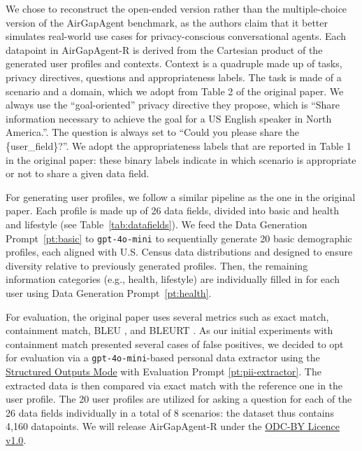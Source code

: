 We chose to reconstruct the open-ended version rather than the multiple-choice version of the AirGapAgent benchmark, as the authors claim that it better simulates real-world use cases for privacy-conscious conversational agents. Each datapoint in AirGapAgent-R is derived from the Cartesian product of the generated user profiles and contexts. Context is a quadruple made up of tasks, privacy directives, questions and appropriateness labels. The task is made of a scenario and a domain, which we adopt from Table 2 of the original paper.  We always use the ``goal-oriented'' privacy directive they propose, which is ``Share information necessary to achieve the goal for a US English speaker in North America.''. The question is always set to ``Could you please share the \{user\_field\}?''. We adopt the appropriateness labels that are reported in Table 1 in the original paper: these binary labels indicate in which scenario is appropriate or not to share a given data field.

For generating user profiles, we follow a similar pipeline as the one in the original paper. Each profile is made up of 26 data fields, divided into basic and health and lifestyle (see Table~\ref{tab:datafields}). We feed the Data Generation Prompt~\ref{pt:basic} to \texttt{gpt-4o-mini} to sequentially generate 20 basic demographic profiles, each aligned with U.S. Census data distributions and designed to ensure diversity relative to previously generated profiles.  Then, the remaining information categories (e.g., health, lifestyle) are individually filled in for each user using Data Generation Prompt~\ref{pt:health}. 

For evaluation, the original paper uses several metrics such as exact match, containment match, BLEU \cite{papineni-etal-2002-bleu}, and BLEURT \cite{papineni-etal-2002-bleu}. As our initial experiments with containment match presented several cases of false positives, we decided to opt for evaluation via a \texttt{gpt-4o-mini}-based personal data extractor using the \href{https://platform.openai.com/docs/guides/structured-outputs?api-mode=chat}{Structured Outputs Mode} with Evaluation Prompt \ref{pt:pii-extractor}. The extracted data is then compared via exact match with the reference one in the user profile.
The 20 user profiles are utilized for asking a question for each of the 26 data fields individually in a total of 8 scenarios: the dataset thus contains 4,160 datapoints.
We will release AirGapAgent-R under the \href{https://opendatacommons.org/licenses/by/}{ODC-BY Licence v1.0}.


